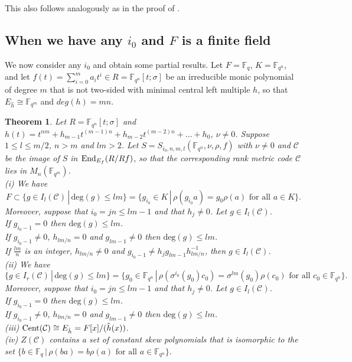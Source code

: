 \documentclass[12pt]{amsart}
\theoremstyle{plain}
\newtheorem{theorem}{Theorem}[section]
\theoremstyle{definition}
\numberwithin{equation}{section}
\numberwithin{figure}{section}
\begin{document}
This also follows analogously as in the proof of \cite[Theorem 9]{Sheekey}.

\subsection{When we have any $i_0$ and $F$ is a finite field}


We now consider any $i_0$ and obtain some partial results. Let $F=\mathbb{F}_{q}$, $K=\mathbb{F}_{q^n}$, and let $f(t)=\sum_{i=0}^ma_it^i\in R=\mathbb{F}_{q^n}[t;\sigma]$ be an irreducible monic polynomial of degree $m$ that is not two-sided with minimal central left multiple $h$, so that $E_{\hat{h}}\cong \mathbb{F}_{q^m}$ and $deg(h)=mn$.

\begin{theorem}\label{theorem 9II}
Let $R=\mathbb{F}_{q^n}[t;\sigma]$ and 
$h(t)=t^{nm}+h_{m-1}t^{(m-1)n}+h_{m-2}t^{(m-2)n}+\dots+h_0$, $\nu\not=0$.
Suppose $1\leq l\leq m/2$, $n>m$ and $lm>2$.
Let $S=S_{i_0,n,m,l}(\mathbb{F}_{q^n},\nu,\rho,f)$ with $\nu\neq 0$ and $\mathcal{C}$ be the image of $S$ in  ${\rm End}_{E_f}(R/Rf)$, so that the corresponding rank metric code  $\mathcal{C}$ lies in $M_n(\mathbb{F}_{q^m})$.
\\ (i) We have
$$F\subset\lbrace g\in I_l(\mathcal{C}) \,|\, \text{deg}(g)\leq lm\rbrace= \lbrace g_{i_0}\in K \,|\, \rho(g_{i_0} a) = g_0\rho(a)  \text{ for all } a\in K\rbrace.$$
Moreover, suppose that $i_0=jn \leq lm-1$
and  that $h_j\not=0$. Let $g \in  I_l(\mathcal{C})$.
\\
If $g_{i_0-1}=0$ then $\text{deg}(g)\leq lm$.
\\ If $g_{i_0-1}\not=0$, $h_{lm/n} =0$  and  $g_{lm-1}\not=0 $
then $\text{deg}(g)\leq lm$.  \\
If $\frac{lm}{n}$ is  an integer, $h_{lm/n}\not =0$ and $ g_{i_0-1}\not =h_j g_{lm-1}h_{lm/n}^{-1}$,
then $g \in  I_l(\mathcal{C})$.
\\ (ii) We have
 $$\lbrace g\in I_r(\mathcal{C}) \,|\, \text{deg}(g)\leq lm\rbrace= \lbrace g_0\in \mathbb{F}_{q^n} \,|\, \rho(\sigma^{i_0}(g_0) c_0) = \sigma^{lm}(g_0)\rho(c_0) \text{ for all } c_0\in \mathbb{F}_{q^n}\rbrace.$$
 Moreover, suppose that $i_0=jn \leq lm-1$ and  that $h_j\not=0$. Let $g \in  I_l(\mathcal{C})$.
\\ If $g_{i_0-1}=0$ then $\text{deg}(g)\leq lm$. \\
 If $g_{i_0-1}\not=0$, $h_{lm/n} =0$  and  $g_{lm-1}\not=0 $
then $\text{deg}(g)\leq lm$.
\\ (iii) ${\rm Cent}(\mathcal{C})\cong E_{\hat{h}}=F[x]/ (\hat{h}(x) )$. %
 \\ (iv) 
 $Z(\mathcal{C})$ contains a set of constant skew polynomials that is isomorphic to the set $ \lbrace b\in \mathbb{F}_{q} \,|\, \rho(b a) = b\rho(a)  \text{ for all } a\in \mathbb{F}_{q^n}\rbrace.$
\end{theorem}
\end{document}
